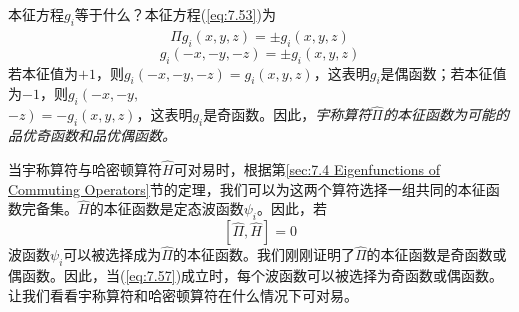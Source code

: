     本征方程$g_i$等于什么？本征方程(\ref{eq:7.53})为
    \begin{equation*}
        \hat{\Pi}g_i\left(x,y,z\right) = \pm g_i\left(x,y,z\right)
    \end{equation*}
    \begin{equation*}
        g_i\left(-x,-y,-z\right) = \pm g_i\left(x,y,z\right)
    \end{equation*}
    若本征值为$+1$，则$g_i\left(-x,-y,-z\right) = g_i\left(x,y,z\right)$，这表明$g_i$是偶函数；若本征值为$-1$，则$g_i\left(-x,-y,\right.$\\$\left.-z\right) = -g_i\left(x,y,z\right)$，这表明$g_i$是奇函数。因此，\textit{宇称算符$\hat{\Pi}$的本征函数为可能的品优奇函数和品优偶函数。}

    当宇称算符与哈密顿算符$\hat{H}$可对易时，根据第\ref{sec:7.4 Eigenfunctions of Commuting Operators}节的定理，我们可以为这两个算符选择一组共同的本征函数完备集。$\hat{H}$的本征函数是定态波函数$\psi_i$。因此，若
    \begin{equation}
        \left[\hat{\Pi}, \hat{H}\right] = 0
        \label{eq:7.57}
    \end{equation}
    波函数$\psi_i$可以被选择成为$\hat{\Pi}$的本征函数。我们刚刚证明了$\hat{\Pi}$的本征函数是奇函数或偶函数。因此，当(\ref{eq:7.57})成立时，每个波函数可以被选择为奇函数或偶函数。让我们看看宇称算符和哈密顿算符在什么情况下可对易。

